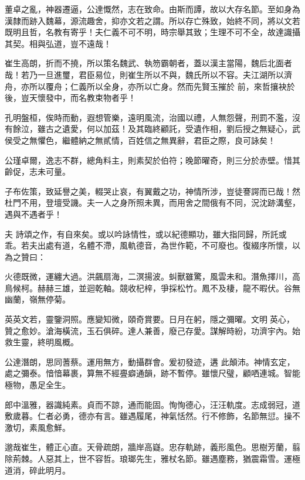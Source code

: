 \begin{pinyinscope}
 董卓之亂，神器遷逼，公達慨然，志在致命。由斯而譚，故以大存名節。至如身為漢隸而跡入魏幕，源流趣舍，抑亦文若之謂。所以存亡殊致，始終不同，將以文若既明且哲，名教有寄乎！夫仁義不可不明，時宗舉其致；生理不可不全，故達識攝其契。相與弘道，豈不遠哉！



 崔生高朗，折而不撓，所以策名魏武、執笏霸朝者，蓋以漢主當陽，魏后北面者哉！若乃一旦進璽，君臣易位，則崔生所以不與，魏氏所以不容。夫江湖所以濟舟，亦所以覆舟；仁義所以全身，亦所以亡身。然而先賢玉摧於
 前，來哲攘袂於後，豈天懷發中，而名教束物者乎！



 孔明盤桓，俟時而動，遐想管樂，遠明風流，治國以禮，人無怨聲，刑罰不濫，沒有餘泣，雖古之遺愛，何以加茲！及其臨終顧託，受遺作相，劉后授之無疑心，武侯受之無懼色，繼體納之無貳情，百姓信之無異辭，君臣之際，良可詠矣！



 公瑾卓爾，逸志不群，總角料主，則素契於伯符；晚節曜奇，則三分於赤壁。惜其齡促，志未可量。



 子布佐策，致延譽之美，輟哭止哀，有翼戴之功，神情所涉，豈徒謇諤而已哉！然杜門不用，登壇受譏。夫一人之身所照未異，而用舍之間俄有不同，況沈跡溝壑，遇與不遇者乎！



 夫
 詩頌之作，有自來矣。或以吟詠情性，或以紀德顯功，雖大指同歸，所託或乖。若夫出處有道，名體不滯，風軌德音，為世作範，不可廢也。復綴序所懷，以為之贊曰：



 火德既微，運纏大過。洪飆扇海，二溟揚波。虯獸雖驚，風雲未和。潛魚擇川，高鳥候柯。赫赫三雄，並迴乾軸。競收杞梓，爭採松竹。鳳不及棲，龍不暇伏。谷無幽蘭，嶺無停菊。



 英英文若，靈鑒洞照。應變知微，頤奇賞要。日月在躬，隱之彌曜。文明英心，贊之愈妙。滄海橫流，玉石俱碎。達人兼善，廢己存愛。謀解時紛，功濟宇內。始救生靈，終明風概。



 公達潛朗，思同蓍蔡。運用無方，動攝群會。爰初發迹，遘
 此顛沛。神情玄定，處之彌泰。愔愔幕裹，算無不經亹癖通韻，跡不暫停。雖懷尺璧，顧哂連城。智能極物，愚足全生。



 郎中溫雅，器識純素。貞而不諒，通而能固。恂恂德心，汪汪軌度。志成弱冠，道敷歲暮。仁者必勇，德亦有言。雖遇履尾，神氣恬然。行不修飾，名節無愆。操不激切，素風愈鮮。



 邈哉崔生，體正心直。天骨疏朗，牆岸高嶷。忠存軌跡，義形風色。思樹芳蘭，翦除荊棘。人惡其上，世不容哲。琅瑯先生，雅杖名節。雖遇塵務，猶震霜雪。運極道消，碎此明月。




\end{pinyinscope}
